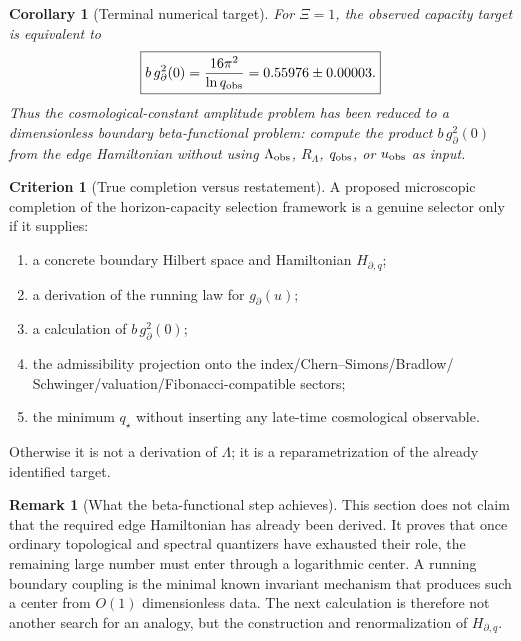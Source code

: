 \documentclass[aps,prd,reprint,nofootinbib,superscriptaddress,floatfix]{revtex4-2}
\numberwithin{equation}{section}
\theoremstyle{definition}
\newtheorem{criterion}{Criterion}[section]
\newtheorem{remark}{Remark}[section]
\theoremstyle{plain}
\newtheorem{corollary}{Corollary}[section]
\begin{document}
\begin{corollary}[Terminal numerical target]
For \(\Xi=1\), the observed capacity target is equivalent to
\begin{equation}
\boxed{
b\,g_\partial^2(0)
=
\frac{16\pi^2}{\ln q_{\rm obs}}
=
0.55976\pm0.00003 .
}
\end{equation}
Thus the cosmological-constant amplitude problem has been reduced to a
dimensionless boundary beta-functional problem: compute the product
\(b\,g_\partial^2(0)\) from the edge Hamiltonian without using
\(\Lambda_{\rm obs}\), \(R_\Lambda\), \(q_{\rm obs}\), or \(u_{\rm obs}\) as input.
\end{corollary}

\begin{criterion}[True completion versus restatement]
A proposed microscopic completion of the horizon-capacity selection framework is a genuine
selector only if it supplies:
\begin{enumerate}
\item a concrete boundary Hilbert space and Hamiltonian \(H_{\partial,q}\);
\item a derivation of the running law for \(g_\partial(u)\);
\item a calculation of \(b\,g_\partial^2(0)\);
\item the admissibility projection onto the index/Chern--Simons/Bradlow/
Schwinger/valuation/Fibonacci-compatible sectors;
\item the minimum \(q_\star\) without inserting any late-time cosmological
observable.
\end{enumerate}
Otherwise it is not a derivation of \(\Lambda\); it is a reparametrization of
the already identified target.
\end{criterion}

\begin{remark}[What the beta-functional step achieves]
This section does not claim that the required edge Hamiltonian has already
been derived.  It proves that once ordinary topological and spectral
quantizers have exhausted their role, the remaining large number must enter
through a logarithmic center.  A running boundary coupling is the minimal
known invariant mechanism that produces such a center from \(O(1)\)
dimensionless data.  The next calculation is therefore not another search
for an analogy, but the construction and renormalization of
\(H_{\partial,q}\).
\end{remark}
\end{document}
